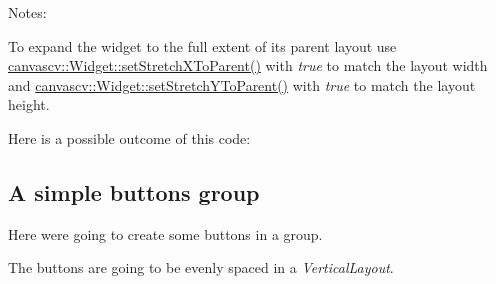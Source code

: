  Notes\+:
\begin{DoxyItemize}
\item To expand the widget to the full extent of it\textquotesingle{}s parent layout use \hyperlink{classcanvascv_1_1Widget_a7b1ed6190950de22565c244f5aac49a4}{canvascv\+::\+Widget\+::set\+Stretch\+X\+To\+Parent()} with {\itshape true} to match the layout width and \hyperlink{classcanvascv_1_1Widget_a825028e2405bfdf9d92d372e60585703}{canvascv\+::\+Widget\+::set\+Stretch\+Y\+To\+Parent()} with {\itshape true} to match the layout height.
\item Here is a possible outcome of this code\+:  ~\newline

\end{DoxyItemize}\hypertarget{tutlayouts_layouts_s2}{}\subsection{A simple buttons group}\label{tutlayouts_layouts_s2}
Here we\textquotesingle{}re going to create some buttons in a group.

The buttons are going to be evenly spaced in a {\itshape Vertical\+Layout}.

